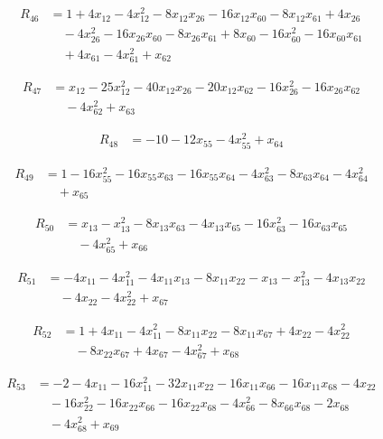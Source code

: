 \documentclass[11pt,letterpaper]{article}
\theoremstyle{definition}
\theoremstyle{remark}
\begin{document}
\begin{align*}
R_{46} &= 1 +4 x_{12} -4 x_{12}^{2} -8 x_{12} x_{26} -16 x_{12} x_{60} -8 x_{12} x_{61} +4 x_{26} \\
&\quad -4 x_{26}^{2} -16 x_{26} x_{60} -8 x_{26} x_{61} +8 x_{60} -16 x_{60}^{2} -16 x_{60} x_{61} \\
&\quad +4 x_{61} -4 x_{61}^{2} +x_{62}
\end{align*}

\begin{align*}
R_{47} &= x_{12} -25 x_{12}^{2} -40 x_{12} x_{26} -20 x_{12} x_{62} -16 x_{26}^{2} -16 x_{26} x_{62} \\
&\quad -4 x_{62}^{2} +x_{63}
\end{align*}

\begin{align*}
R_{48} &= -10 -12 x_{55} -4 x_{55}^{2} +x_{64}
\end{align*}

\begin{align*}
R_{49} &= 1 -16 x_{55}^{2} -16 x_{55} x_{63} -16 x_{55} x_{64} -4 x_{63}^{2} -8 x_{63} x_{64} -4 x_{64}^{2} \\
&\quad +x_{65}
\end{align*}

\begin{align*}
R_{50} &= x_{13} -x_{13}^{2} -8 x_{13} x_{63} -4 x_{13} x_{65} -16 x_{63}^{2} -16 x_{63} x_{65} \\
&\quad -4 x_{65}^{2} +x_{66}
\end{align*}

\begin{align*}
R_{51} &= -4 x_{11} -4 x_{11}^{2} -4 x_{11} x_{13} -8 x_{11} x_{22} -x_{13} -x_{13}^{2} -4 x_{13} x_{22} \\
&\quad -4 x_{22} -4 x_{22}^{2} +x_{67}
\end{align*}

\begin{align*}
R_{52} &= 1 +4 x_{11} -4 x_{11}^{2} -8 x_{11} x_{22} -8 x_{11} x_{67} +4 x_{22} -4 x_{22}^{2} \\
&\quad -8 x_{22} x_{67} +4 x_{67} -4 x_{67}^{2} +x_{68}
\end{align*}

\begin{align*}
R_{53} &= -2 -4 x_{11} -16 x_{11}^{2} -32 x_{11} x_{22} -16 x_{11} x_{66} -16 x_{11} x_{68} -4 x_{22} \\
&\quad -16 x_{22}^{2} -16 x_{22} x_{66} -16 x_{22} x_{68} -4 x_{66}^{2} -8 x_{66} x_{68} -2 x_{68} \\
&\quad -4 x_{68}^{2} +x_{69}
\end{align*}
\end{document}
